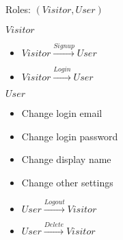 Roles: $(Visitor, User)$

\begin{samepage}
	$Visitor$
	\begin{itemize}
		\item $Visitor \xrightarrow{Signup}User$

		\item $Visitor \xrightarrow{Login}User$
	\end{itemize}
\end{samepage}

\begin{samepage}
	$User$
	\begin{itemize}
		\item Change login email

		\item Change login password

		\item Change display name

		\item Change other settings \textdagger

		\item $User \xrightarrow{Logout}Visitor$

		\item $User \xrightarrow{Delete}Visitor$
	\end{itemize}
\end{samepage}
